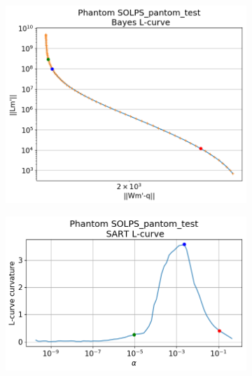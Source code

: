 \begin{figure}
\begin{subfigure}{0.45\linewidth}
         \includegraphics[trim={0 0 0 45},clip,width=\textwidth]{Chapters/chapter2/figs/inversion_comparison_L_curve_SOLPS_pantom_test-Bayes.png}
         \caption{}
         \label{fig:SOLPS_phantom2b}
     \end{subfigure}
     \begin{subfigure}{0.45\linewidth}
         \centering
         \includegraphics[trim={0 0 0 45},clip,width=\textwidth]{Chapters/chapter2/figs/inversion_comparison_L_curve_curvature_SOLPS_pantom_test-SART.png}
         \caption{}
         \label{fig:SOLPS_phantom2c}
     \end{subfigure}
     \hfill
     \begin{subfigure}{0.45\linewidth}
         \centering

\end{subfigure}
\end{figure}
